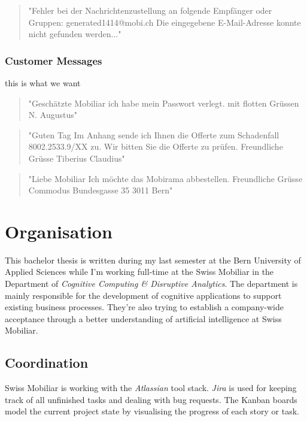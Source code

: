 \begin{quote}
    "Fehler bei der Nachrichtenzustellung an folgende Empfänger oder Gruppen: generated1414@mobi.ch Die eingegebene E-Mail-Adresse konnte nicht gefunden werden..."
\end{quote}

\subsubsection{Customer Messages}

this is what we want

\begin{quote}
    "Geschätzte Mobiliar ich habe mein Passwort verlegt. mit flotten Grüssen N. Augustus"
\end{quote}

\begin{quote}
    "Guten Tag Im Anhang sende ich Ihnen die Offerte zum Schadenfall 8002.2533.9/XX zu. Wir bitten Sie die Offerte zu prüfen. Freundliche Grüsse Tiberius Claudius"
\end{quote}

\begin{quote}
    "Liebe Mobiliar Ich möchte das Mobirama abbestellen. Freundliche Grüsse Commodus Bundesgasse 35 3011 Bern"
\end{quote}

\section{Organisation}

This bachelor thesis is written during my last semester at the Bern University of Applied Sciences while I'm working full-time
at the Swiss Mobiliar in the Department of \emph{Cognitive Computing \& Disruptive Analytics}. The department is mainly responsible
for the development of cognitive applications to support existing business processes. They're also trying to establish a
company-wide acceptance through a better understanding of artificial intelligence at Swiss Mobiliar.

\subsection{Coordination}

Swiss Mobiliar is working with the \emph{Atlassian} tool stack. \emph{Jira} is used for keeping track of all unfinished tasks and
dealing with bug requests. The Kanban boards model the current project state by visualising the progress of each story or task.

